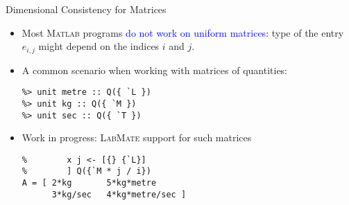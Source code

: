 \documentclass[]{beamer}
\newcommand{\tikzmark}[1]{\tikz[overlay,remember picture,baseline=-0.5ex] \node (#1) {};}
\newcommand{\keyword}[1]{\textcolor{blue}{#1}}
\newcommand{\lm}{\textsc{LabMate}\xspace}
\newcommand{\ma}{\textsc{Matlab}\xspace}
\begin{document}
\begin{frame}[fragile]{Dimensional Consistency for Matrices}
  \begin{itemize}[<+->]
  \item Most \ma programs \keyword{do not work on uniform matrices}: type of the entry $e_{i, j}$ might depend on the indices $i$ and $j$.
    \medskip
  \item A common scenario when working with matrices of quantities:
\begin{lstlisting}[xleftmargin=0em]
%> dimensions V for Q over `L, `M, `T
%> unit metre :: Q({ `L })
%> unit kg :: Q({ `M })
%> unit sec :: Q({ `T })
\end{lstlisting}
\medskip
\item Work in progress: \lm support for such matrices
\begin{lstlisting}[xleftmargin=0em]
% > A :: [ i <- [{} {`T}]
%        x j <- [{} {`L}]
%        ] Q({`M * j / i})
A = [ 2*kg       5*kg*metre
      3*kg/sec   4*kg*metre/sec ]
\end{lstlisting}
  \end{itemize}
\end{frame}
\end{document}
